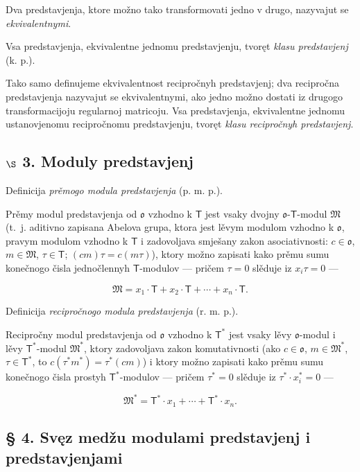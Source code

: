 \documentclass[11pt]{article}
\begin{document}
Dva predstavjenja, ktore možno tako transformovati jedno v drugo, nazyvajut se \emph{ekvivalentnymi}.

Vsa predstavjenja, ekvivalentne jednomu predstavjenju, tvoręt \emph{klasu predstavjenj} (k. p.).

Tako samo definujeme ekvivalentnost recipročnyh predstavjenj; dva recipročna predstavjenja nazyvajut se ekvivalentnymi, ako jedno možno dostati iz drugogo transformacijoju regularnoj matricoju. Vsa predstavjenja, ekvivalentne jednomu ustanovjenomu recipročnomu predstavjenju, tvoręt \emph{klasu recipročnyh predstavjenj}.

\subsection*{\texorpdfstring{\(\S\) 3. Moduly predstavjenj}{\textbackslash S 3. Moduly predstavjenj}}\label{s-3.-darstellungsmoduln}

Definicija \emph{prěmogo modula predstavjenja} (p. m. p.).

Prěmy modul predstavjenja od \(\mathfrak{o}\) vzhodno k \(\mathsf T\) jest vsaky dvojny \(\mathfrak{o}\)-\(\mathsf T\)-modul \(\mathfrak M\) (t.~j. aditivno zapisana Abelova grupa, ktora jest lěvym modulom vzhodno k \(\mathfrak{o}\), pravym modulom vzhodno k \(\mathsf T\) i zadovoljava smješany zakon asociativnosti: \(c\in\mathfrak{o}\), \(m\in\mathfrak M\), \(\tau\in\mathsf T\); \((cm)\tau=c(m\tau)\)), ktory možno zapisati kako prěmu sumu konečnogo čisla jednočlennyh \(\mathsf T\)-modulov --- pričem \(\tau=0\) slěduje iz \(x_i\tau=0\) ---

\[
\mathfrak M=x_1\cdot\mathsf T+x_2\cdot\mathsf T+\cdots+x_n\cdot\mathsf T.
\]

Definicija \emph{recipročnogo modula predstavjenja} (r. m. p.).

Recipročny modul predstavjenja od \(\mathfrak{o}\) vzhodno k \(\mathsf T^*\) jest vsaky lěvy \(\mathfrak{o}\)-modul i lěvy \(\mathsf T^*\)-modul \(\mathfrak M^*\), ktory zadovoljava zakon komutativnosti (ako \(c\in\mathfrak{o}\), \(m\in\mathfrak M^*\), \(\tau\in\mathsf T^*\), to \(c(\tau^*m^*)=\tau^*(cm)\)) i ktory možno zapisati kako prěmu sumu konečnogo čisla prostyh \(\mathsf T^*\)-modulov --- pričem \(\tau^*=0\) slěduje iz \(\tau^*\cdot x_i^*=0\) ---

\[
\mathfrak M^*=\mathsf T^*\cdot x_1+\cdots+\mathsf T^*\cdot x_n.
\]

\subsection*{§ 4. Svęz medžu modulami predstavjenj i predstavjenjami}\label{der-zusammenhang-zwischen-darstellungsmoduln-und-darstellungen}
\end{document}

